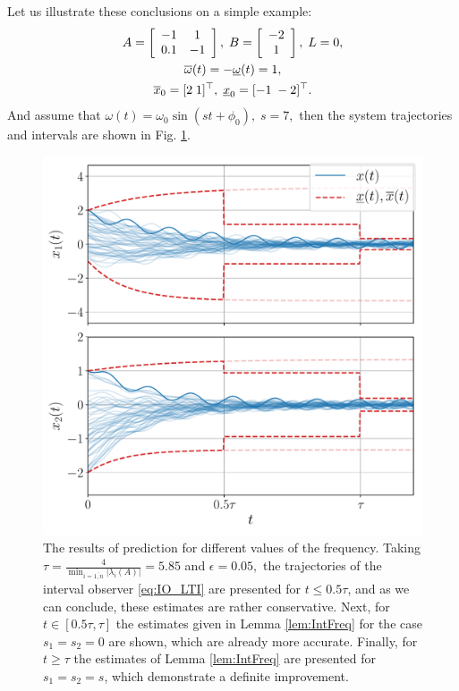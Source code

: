 \begin{example*}
	Let us illustrate these conclusions on a simple example:
	\begin{gather*}
	A=\left[\begin{array}{cc}
	-1 & 1\\
	0.1 & -1
	\end{array}\right],\;B=\left[\begin{array}{c}
	-2\\
	1
	\end{array}\right],\;L=0,\\
	\overline{\omega}(t)=-\underline{\omega}(t)=1,\\
	\overline{x}_{0}=[2\;1]^{\top},\;\underline{x}_{0}=[-1\;-2]^{\top}.
	\end{gather*}
	And assume that
	$
	\omega(t)=\omega_0\sin(st+\phi_0),\;s=7,
	$
	then the system trajectories and intervals are shown in Fig. \ref{fig:IntFreq}. 
	\begin{figure}
		\begin{centering}
			\includegraphics[width=\linewidth]{img/asymptotic}
			\par\end{centering}
		\caption{\label{fig:IntFreq} The results of prediction for different values
			of the frequency. Taking $\tau=\frac{4}{\min_{i=\overline{1,n}}|\lambda_{i}(A)|}=5.85$ and $\epsilon=0.05,$ the trajectories of the interval observer \eqref{eq:IO_LTI} are presented for $t\leq0.5\tau$, and as we can conclude, these estimates are rather conservative. Next, for $t\in[0.5\tau,\tau]$ the estimates given in Lemma \ref{lem:IntFreq} for the case $s_{1}=s_{2}=0$ are shown, which are already more accurate. Finally, for $t\geq\tau$ the estimates of Lemma \ref{lem:IntFreq} are presented for $s_{1}=s_{2}=s$, which demonstrate a definite improvement. }
	\end{figure}
\end{example*}

